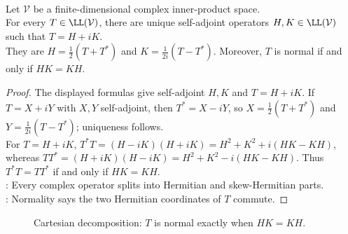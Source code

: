 \begin{proposition} \label{prop:cartesian-decomposition-normal-commuting-parts} \\
Let $\mathcal{V}$ be a finite-dimensional complex inner-product space.\\
For every $T\in\LL(\mathcal{V})$, there are unique self-adjoint operators $H,K\in\LL(\mathcal{V})$ such that $T=H+iK$.\\
They are $H=\frac{1}{2}(T+T^*)$ and $K=\frac{1}{2i}(T-T^*)$. Moreover, $T$ is normal if and only if $HK=KH$.
\begin{proof}
The displayed formulas give self-adjoint $H,K$ and $T=H+iK$. If $T=X+iY$ with $X,Y$ self-adjoint, then $T^*=X-iY$, so $X=\frac{1}{2}(T+T^*)$ and $Y=\frac{1}{2i}(T-T^*)$; uniqueness follows.\\
For $T=H+iK$, $T^*T=(H-iK)(H+iK)=H^2+K^2+i(HK-KH)$,\\
whereas $TT^*=(H+iK)(H-iK)=H^2+K^2-i(HK-KH)$. Thus $T^*T=TT^*$ if and only if $HK=KH$.\\
: Every complex operator splits into Hermitian and skew-Hermitian parts.\\
: Normality says the two Hermitian coordinates of $T$ commute.
\end{proof}
\end{proposition}

\begin{figure}[H]
  \centering
  
  \caption{Cartesian decomposition: $T$ is normal exactly when $HK=KH$.}
  \label{fig:cartesian-normal-commutation}
\end{figure}

